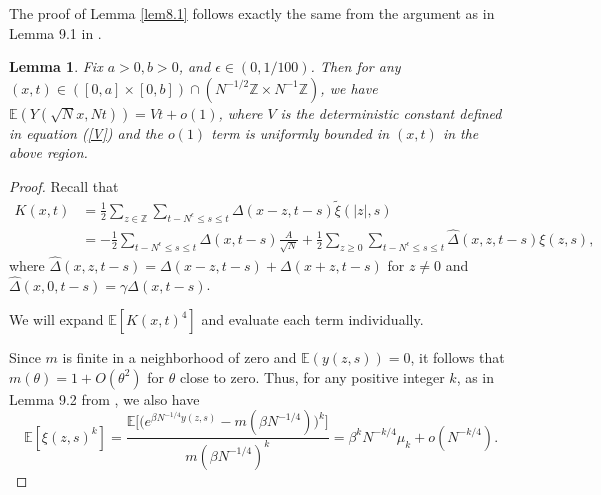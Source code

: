 \documentclass[10pt]{article}
\newtheorem{lemma}[theorem]{Lemma}
\begin{document}
     The proof of Lemma \ref{lem8.1} follows exactly the same from the argument as in Lemma 9.1 in \cite{adhikari2022invariance}.

\begin{lemma} \label{8.2}
    Fix $a>0, b>0$, and $\epsilon \in(0,1 / 100)$. Then for any $(x, t) \in \left([0, a ] \times [0, b]\right) \cap \left(N^{-1/2} \mathbb{Z} \times N^{-1} \mathbb{Z}\right)$, we have $\mathbb{E}(Y(\sqrt{N}x, Nt))=V t +o(1)$, where $V$ is the deterministic constant defined in equation (\ref{V}) and the $o(1)$ term is uniformly bounded in $(x, t)$ in the above region.
\end{lemma}
\begin{proof}
Recall that
\begin{equation} \label{Kexpand}
    \begin{aligned}
        K(x, t)&=\frac{1}{2} \sum_{z \in \mathbb{Z}} \sum_{t-N^{\epsilon} \leq s \leq t} \Delta(x-z, t-s) \tilde{\xi}(|z|, s)\\
        &=-\frac{1}{2} \sum_{t-N^{\epsilon} \leq s \leq t} \Delta(x, t-s)
        \frac{A}{\sqrt{N}}+\frac{1}{2} \sum_{z \geq 0} \sum_{t-N^{\epsilon} \leq s \leq t} \hat{\Delta}(x,z, t-s) \xi(z,s),
    \end{aligned}
\end{equation}
where $\hat{\Delta}(x,z, t-s)=\Delta(x-z, t-s)+\Delta(x+z, t-s)$ for $z \neq 0$ and $\hat{\Delta}(x,0, t-s)=\gamma\Delta(x, t-s)$.

We will expand $\mathbb{E}[K(x,t)^4]$ and evaluate each term individually.

Since $m$ is finite in a neighborhood of zero and $\mathbb{E}(y(z, s))=0$, it follows that $m(\theta)=1+O\left(\theta^{2}\right)$ for $\theta$ close to zero. Thus, for any positive integer $k$, as in Lemma 9.2 from \cite{adhikari2022invariance}, we also have
\begin{equation}\label{momentestimate}
    \mathbb{E}[\xi(z, s)^{k}]=\frac{\mathbb{E}\big[\big(e^{\beta N^{-1 / 4} y(z, s)}-m(\beta N^{-1 / 4})\big)^{k}\big]}{m\left(\beta N^{-1 / 4}\right)^{k}}  =\beta^{k} N^{-k / 4} \mu_{k}+o\left(N^{-k / 4}\right).
\end{equation}


\end{proof}
\end{document}
